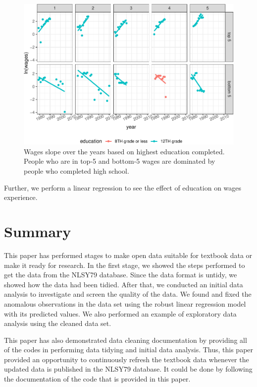 \documentclass[12pt]{article}
\begin{document}
\begin{figure}

{\centering \includegraphics[width=468px]{figures/slope-educ-1} 

}

\caption{Wages slope over the years based on highest education completed. People who are in top-5 and bottom-5 wages are dominated by people who completed high school.}\label{fig:slope-educ}
\end{figure}

Further, we perform a linear regression to see the effect of education on wages experience.

\hypertarget{summary}{%
\section{Summary}\label{summary}}

This paper has performed stages to make open data suitable for textbook data or make it ready for research. In the first stage, we showed the steps performed to get the data from the NLSY79 database. Since the data format is untidy, we showed how the data had been tidied. After that, we conducted an initial data analysis to investigate and screen the quality of the data. We found and fixed the anomalous observations in the data set using the robust linear regression model with its predicted values. We also performed an example of exploratory data analysis using the cleaned data set.

This paper has also demonstrated data cleaning documentation by providing all of the codes in performing data tidying and initial data analysis. Thus, this paper provided an opportunity to continuously refresh the textbook data whenever the updated data is published in the NLSY79 database. It could be done by following the documentation of the code that is provided in this paper.
\end{document}
